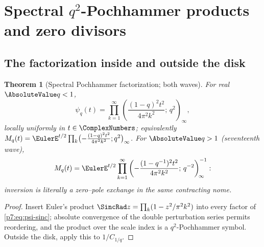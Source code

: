 \documentclass[11pt,oneside]{article}
\numberwithin{equation}{section}
\newtheorem{theorem}{Theorem}[section]
\theoremstyle{definition}
\theoremstyle{remark}
\begin{document}
\section{Spectral \texorpdfstring{$q^2$}{q\^2}-Pochhammer products and zero divisors}
\label{p7:sec:spectral}

\subsection{The factorization inside and outside the disk}

\begin{theorem}[Spectral Pochhammer factorization; both waves]
\label{p7:thm:sinc-poch}
For real $\AbsoluteValue q<1$,
\begin{equation}\label{p7:eq:sinc-poch}
 \boxed{\ \psi_q(t)=\prod_{k=1}^{\infty}
 \left(\frac{(1-q)^2t^2}{4\pi^2k^2};\,q^2\right)_{\!\infty},\ }
\end{equation}
locally uniformly in $t\in\ComplexNumbers$; equivalently
$M_q(t)=\EulerE^{t/2}\prod_k\bigl(-\tfrac{(1-q)^2t^2}{4\pi^2k^2};q^2\bigr)_\infty$.
For $\AbsoluteValue q>1$ (seventeenth wave),
\begin{equation}\label{p7:eq:sinc-poch-outside}
 M_q(t)=\EulerE^{t/2}\prod_{k=1}^{\infty}
 \left(-\frac{(1-q^{-1})^2t^2}{4\pi^2k^2};\,q^{-2}\right)_{\!\infty}^{-1}:
\end{equation}
inversion is literally a zero--pole exchange in the same contracting nome.
\end{theorem}

\begin{proof}
Insert Euler's product $\SincRad z=\prod_k(1-z^2/\pi^2k^2)$ into every factor of
\eqref{p7:eq:psi-sinc}; absolute convergence of the double perturbation series
permits reordering, and the product over the scale index is a
$q^2$-Pochhammer symbol.  Outside the disk, apply this to $1/C_{1/q}$.
\end{proof}
\end{document}
